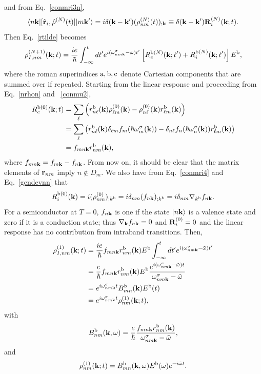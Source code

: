 \documentclass[floatfix,prb,aps,superscriptaddress,11pt,preprint,letterpaper]{revtex4}
\begin{document}
and from Eq.~\eqref{conmri3n},
\begin{equation}\label{conmri4}
\langle n\mathbf{k} |[\hat{\mathbf{r}}_i,\hat\rho^{(N)}(t)]| m\mathbf{k}' \rangle
=i \delta(\mathbf{k}-\mathbf{k}') (\rho^{(N)}_{nm}(t))_{;\mathbf{k}}
\equiv \delta(\mathbf{k}-\mathbf{k}')\mathbf{R}_i^{(N)}(\mathbf{k};t)
.
\end{equation}
Then Eq.~\eqref{rtilde} becomes
\begin{equation}\label{rtilde2}
{\rho}^{(N+1)}_{I,nm}(\mathbf{k};t)
=\frac{ie}{\hbar}\int_{-\infty}^t dt'
e^{i(\omega^\sigma_{nm\mathbf{k}}-\tilde\omega)t'}
\left[R_e^{\mathrm{b}(N)}(\mathbf{k};t')+R_i^{\mathrm{b}(N)}(\mathbf{k};t')\right]E^{\mathrm{b}}
,
\end{equation}
where the roman superindices
$\mathrm{a},\mathrm{b},\mathrm{c}$ denote Cartesian components that are summed over if repeated.
Starting from the linear response and proceeding from Eq.~\eqref{nrhon} and ~\eqref{conmu2},
\begin{align}\label{R0e}
R_e^{\mathrm{b}(0)}(\mathbf{k};t)
&=
\sum_{\ell}
\left(
r^{\mathrm{b}}_{n\ell}(\mathbf{k})
{\rho}^{(0)}_{\ell m}(\mathbf{k})
-
{\rho}^{(0)}_{n\ell}(\mathbf{k})
r^{\mathrm{b}}_{\ell m}(\mathbf{k})
\right)
\nonumber \\
&=
\sum_{\ell}
\left(
r^{\mathrm{b}}_{n\ell}(\mathbf{k})
\delta_{\ell m}f_m(\hbar\omega^\sigma_m(\mathbf{k}))
-
\delta_{n\ell}f_n(\hbar\omega^\sigma_n(\mathbf{k}))
r^{\mathrm{b}}_{\ell m}(\mathbf{k})
\right)
\nonumber \\
&=
f_{mn\mathbf{k}}
r^{\mathrm{b}}_{nm}(\mathbf{k})
,
\end{align}
where $f_{mn\mathbf{k}}=f_{m\mathbf{k}}-f_{n\mathbf{k}}$.
From now on,
it should be clear that the matrix elements of $\mathbf{r}_{nm}$ imply
$n\notin D_m$.
We also have from Eq.~\eqref{conmri4} and Eq.~\eqref{gendevnn} that
\begin{equation}\label{R0i}
R_i^{\mathrm{b}(0)}(\mathbf{k})=i(\rho^{(0)}_{nm})_{;k^{\mathrm{b}}}=i\delta_{nm}(f_{n\mathbf{k}})_{;k^{\mathrm{b}}}=i\delta_{nm}\nabla_{k^{\mathrm{b}}} f_{n\mathbf{k}}
.
\end{equation}
For a semiconductor at $T=0$, $f_{n\mathbf{k}}$ is one if the state
$| n\mathbf{k} \rangle$ is a valence state and zero if it is a conduction state; 
thus $\nabla_{\mathbf{k}} f_{n\mathbf{k}}=0$ and $\mathbf{R}_i^{(0)}=0$ and
the linear response has no contribution from
intraband transitions.
 Then,
\begin{align}\label{rtilde2n}
{\rho}^{(1)}_{I,nm}(\mathbf{k};t)
&=\frac{ie}{\hbar}
f_{mn\mathbf{k}}
r^{\mathrm{b}}_{nm}(\mathbf{k})E^{\mathrm{b}}
\int_{-\infty}^t dt'
e^{i(\omega^\sigma_{nm\mathbf{k}}-\tilde\omega)t'}
\nonumber \\
&=\frac{e}{\hbar}
f_{mn\mathbf{k}}
r^{\mathrm{b}}_{nm}(\mathbf{k})E^{\mathrm{b}}
\frac{e^{i(\omega^\sigma_{nm\mathbf{k}}-\tilde\omega)t}}
{\omega^\sigma_{nm\mathbf{k}}-\tilde\omega}
\nonumber \\
&=
e^{i\omega^\sigma_{nm\mathbf{k}}t}
B^{\mathrm{b}}_{mn}(\mathbf{k})E^{\mathrm{b}}(t)
\nonumber \\
&=
e^{i\omega^\sigma_{nm\mathbf{k}}t}
\rho^{(1)}_{nm}(\mathbf{k};t)
,
\end{align}
with
\begin{equation}\label{rho1} 
B^{\mathrm{b}}_{nm}(\mathbf{k},\omega)=
\frac{e}{\hbar}\frac{f_{mn\mathbf{k}}r^{\mathrm{b}}_{nm}(\mathbf{k})}{\omega^\sigma_{nm\mathbf{k}}-\tilde\omega}
,
\end{equation} 
and
\begin{equation}\label{rhonoi1}
\rho^{(1)}_{nm}(\mathbf{k};t)=B^{\mathrm{b}}_{mn}(\mathbf{k},\omega)E^{\mathrm{b}}(\omega)e^{-i\tilde\omega t}
.
\end{equation}
\end{document}
